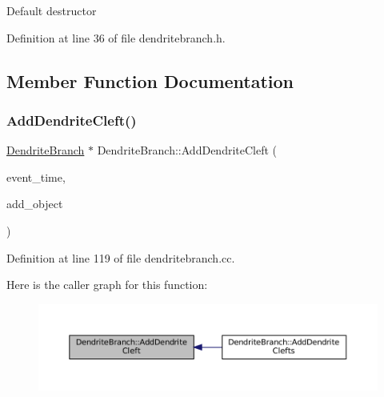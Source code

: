 Default destructor 

Definition at line 36 of file dendritebranch.\+h.



\subsection{Member Function Documentation}
\mbox{\label{class_dendrite_branch_a060f0c55b2e6cb65b68e160df0bbf563}} 
\subsubsection{\texorpdfstring{Add\+Dendrite\+Cleft()}{AddDendriteCleft()}}
{\footnotesize\ttfamily \mbox{\hyperlink{class_dendrite_branch}{Dendrite\+Branch}} $\ast$ Dendrite\+Branch\+::\+Add\+Dendrite\+Cleft (\begin{DoxyParamCaption}\item[{std\+::chrono\+::time\+\_\+point$<$ \mbox{\hyperlink{universe_8h_a0ef8d951d1ca5ab3cfaf7ab4c7a6fd80}{Clock}} $>$}]{event\+\_\+time,  }\item[{\mbox{\hyperlink{class_dendrite_branch}{Dendrite\+Branch}} $\ast$}]{add\+\_\+object }\end{DoxyParamCaption})}



Definition at line 119 of file dendritebranch.\+cc.

Here is the caller graph for this function\+:\nopagebreak
\begin{figure}[H]
\begin{center}
\leavevmode
\includegraphics[width=350pt]{class_dendrite_branch_a060f0c55b2e6cb65b68e160df0bbf563_icgraph}
\end{center}
\end{figure}
\mbox{\label{class_dendrite_branch_a2ddeff41db805e414c994ac169cbcf4b}} 
